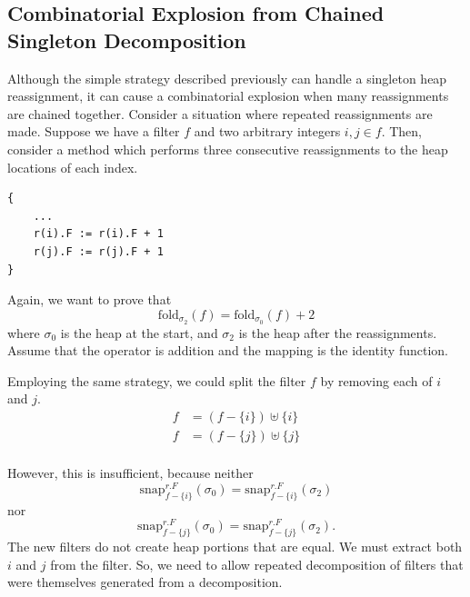 \documentclass[msc,oneside]{ubcthesis}
\begin{document}
\subsection{Combinatorial Explosion from Chained Singleton Decomposition}
Although the simple strategy described previously can handle a singleton heap reassignment, it can cause a combinatorial explosion when many reassignments are chained together. Consider a situation where repeated reassignments are made. Suppose we have a filter $f$ and two arbitrary integers $i, j \in f$. Then, consider a method which performs three consecutive reassignments to the heap locations of each index.
\begin{lstlisting}
{
    ...
    r(i).F := r(i).F + 1 
    r(j).F := r(j).F + 1 
}
\end{lstlisting}

Again, we want to prove that $$\textrm{fold}_{\sigma_2}(f) = \textrm{fold}_{\sigma_0}(f) + 2 $$ where $\sigma_0$ is the heap at the start, and $\sigma_2$ is the heap after the reassignments. Assume that the operator is addition and the mapping is the identity function.

Employing the same strategy, we could split the filter $f$ by removing each of $i$ and $j$.
\begin{align*} 
f &= \left( f - \{i\}\right) \uplus \{i\} \\
f &= \left( f - \{j\}\right) \uplus \{j\} \\
\end{align*}

However, this is insufficient, because neither $$\textrm{snap}^{r.F}_{f - \{i\}}(\sigma_0) = \textrm{snap}^{r.F}_{f - \{i\}}(\sigma_2)$$ nor $$\textrm{snap}^{r.F}_{f - \{j\}}(\sigma_0) = \textrm{snap}^{r.F}_{f - \{j\}}(\sigma_2).$$
The new filters do not create heap portions that are equal. We must extract both $i$ and $j$ from the filter. So, we need to allow repeated decomposition of filters that were themselves generated from a decomposition.
\end{document}
